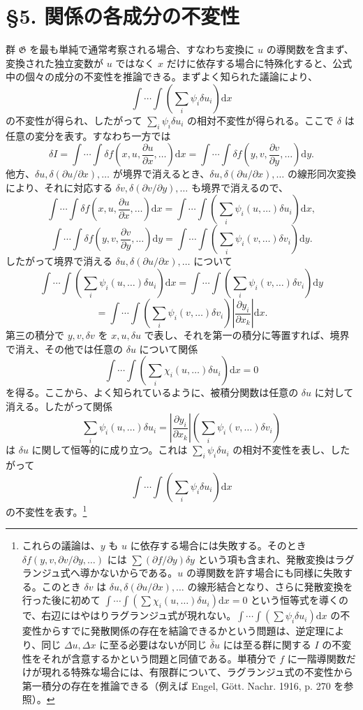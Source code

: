 \documentclass[11pt]{article}
\newcommand{\D}{\Delta}
\providecommand{\dd}{\mathrm d}
\providecommand{\G}{\mathfrak G}
\providecommand{\bd}{\bar{\delta}}
\providecommand{\p}{\partial}
\begin{document}
\section*{\S{}5. 関係の各成分の不変性}

群 \(\G\) を最も単純で通常考察される場合、すなわち変換に \(u\) の導関数を含まず、変換された独立変数が \(u\) ではなく \(x\) だけに依存する場合に特殊化すると、公式中の個々の成分の不変性を推論できる。まずよく知られた議論により、
\[
\int\!\cdots\!\int\left(\sum_i\psi_i\delta u_i\right)\dd x
\]
の不変性が得られ、したがって \(\sum_i\psi_i\delta u_i\) の相対不変性が得られる。ここで \(\delta\) は任意の変分を表す。すなわち一方では
\[
\delta I
=\int\!\cdots\!\int \delta f\!\left(x,u,\frac{\p u}{\p x},\ldots\right)\dd x
=\int\!\cdots\!\int \delta f\!\left(y,v,\frac{\p v}{\p y},\ldots\right)\dd y.
\]
他方、\(\delta u,\delta(\p u/\p x),\ldots\) が境界で消えるとき、\(\delta u,\delta(\p u/\p x),\ldots\) の線形同次変換により、それに対応する \(\delta v,\delta(\p v/\p y),\ldots\) も境界で消えるので、
\[
\int\!\cdots\!\int \delta f\!\left(x,u,\frac{\p u}{\p x},\ldots\right)\dd x
=
\int\!\cdots\!\int\left(\sum_i\psi_i(u,\ldots)\delta u_i\right)\dd x,
\]
\[
\int\!\cdots\!\int \delta f\!\left(y,v,\frac{\p v}{\p y},\ldots\right)\dd y
=
\int\!\cdots\!\int\left(\sum_i\psi_i(v,\ldots)\delta v_i\right)\dd y.
\]
したがって境界で消える \(\delta u,\delta(\p u/\p x),\ldots\) について
\[
\int\!\cdots\!\int\left(\sum_i\psi_i(u,\ldots)\delta u_i\right)\dd x
=
\int\!\cdots\!\int\left(\sum_i\psi_i(v,\ldots)\delta v_i\right)\dd y
\]
\[
=
\int\!\cdots\!\int\left(\sum_i\psi_i(v,\ldots)\delta v_i\right)
\left|\frac{\p y_i}{\p x_k}\right|\dd x.
\]
第三の積分で \(y,v,\delta v\) を \(x,u,\delta u\) で表し、それを第一の積分に等置すれば、境界で消え、その他では任意の \(\delta u\) について関係
\[
\int\!\cdots\!\int\left(\sum_i\chi_i(u,\ldots)\delta u_i\right)\dd x=0
\]
を得る。ここから、よく知られているように、被積分関数は任意の \(\delta u\) に対して消える。したがって関係
\[
\sum_i\psi_i(u,\ldots)\delta u_i
=
\left|\frac{\p y_i}{\p x_k}\right|
\left(\sum_i\psi_i(v,\ldots)\delta v_i\right)
\]
は \(\delta u\) に関して恒等的に成り立つ。これは \(\sum_i\psi_i\delta u_i\) の相対不変性を表し、したがって
\[
\int\!\cdots\!\int\left(\sum_i\psi_i\delta u_i\right)\dd x
\]
の不変性を表す。\footnote{これらの議論は、\(y\) も \(u\) に依存する場合には失敗する。そのとき \(\delta f(y,v,\p v/\p y,\ldots)\) には \(\sum(\p f/\p y)\delta y\) という項も含まれ、発散変換はラグランジュ式へ導かないからである。\(u\) の導関数を許す場合にも同様に失敗する。このとき \(\delta v\) は \(\delta u,\delta(\p u/\p x),\ldots\) の線形結合となり、さらに発散変換を行った後に初めて \(\int\!\cdots\!\int(\sum\chi_i(u,\ldots)\delta u_i)\dd x=0\) という恒等式を導くので、右辺にはやはりラグランジュ式が現れない。\(\int\!\cdots\!\int(\sum\psi_i\delta u_i)\dd x\) の不変性からすでに発散関係の存在を結論できるかという問題は、逆定理により、同じ \(\D u,\D x\) に至る必要はないが同じ \(\bd u\) には至る群に関する \(I\) の不変性をそれが含意するかという問題と同値である。単積分で \(f\) に一階導関数だけが現れる特殊な場合には、有限群について、ラグランジュ式の不変性から第一積分の存在を推論できる（例えば Engel, Gött. Nachr. 1916, p. 270 を参照）。}
\end{document}
